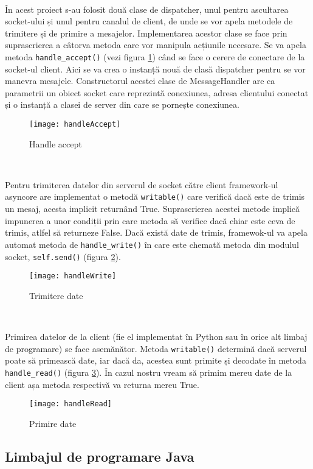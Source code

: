 \documentclass[../IoMusT.tex]{subfiles}
\begin{document}
\\
\par În acest proiect s-au folosit două clase de dispatcher, unul pentru ascultarea socket-ului și unul pentru canalul de client, de unde se vor apela metodele de trimitere și de primire a mesajelor. Implementarea acestor clase se face prin suprascrierea a câtorva metoda care vor manipula acțiunile necesare. Se va apela metoda \verb|handle_accept()| (vezi figura \ref{fig:accept}) când se face o cerere de conectare de la socket-ul client. Aici se va crea o instanță nouă de clasă dispatcher pentru se vor manevra mesajele. Constructorul acestei clase de MessageHandler are ca parametrii un obiect socket care reprezintă conexiunea, adresa clientului conectat și o instanță a clasei de server din care se pornește conexiunea.
\begin{figure}[h]
\centering
\texttt{[image: handleAccept]}
\caption{Handle accept}
\label{fig:accept}
\end{figure}
\\
\par Pentru trimiterea datelor din serverul de socket către client framework-ul asyncore are implementat o metodă \verb|writable()| care verifică dacă este de trimis un mesaj, acesta implicit returnând True. Suprascrierea acestei metode implică impunerea a unor condiții prin care metoda să verifice dacă chiar este ceva de trimis, atlfel să returneze False. Dacă există date de trimis, framewok-ul va apela automat metoda de \verb|handle_write()| în care este chemată metoda din modulul socket, \verb|self.send()| (figura \ref{fig:write}).
\begin{figure}[h]
\centering
\texttt{[image: handleWrite]}
\caption{Trimitere date}
\label{fig:write}
\end{figure}
\\
\par Primirea datelor de la client (fie el implementat în Python sau în orice alt limbaj de programare) se face asemănător. Metoda \verb|writable()| determină dacă serverul poate să primească date, iar dacă da, acestea sunt primite și decodate în metoda \verb|handle_read()| (figura \ref{fig:read}). În cazul nostru vream să primim mereu date de la client așa metoda respectivă va returna mereu True.
\begin{figure}[h]
\centering
\texttt{[image: handleRead]}
\caption{Primire date}
\label{fig:read}
\end{figure}

\subsection{Limbajul de programare Java}
\end{document}
